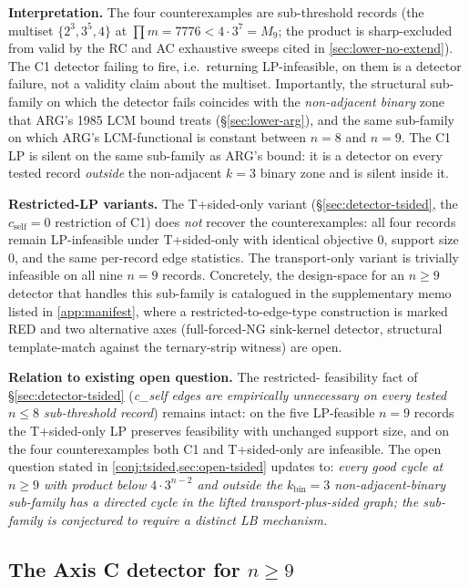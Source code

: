 \documentclass[11pt,a4paper]{article}
\theoremstyle{plain}
\theoremstyle{definition}
\begin{document}
\textbf{Interpretation.} The four counterexamples are sub-threshold
records (the multiset $\{2^3, 3^5, 4\}$ at $\prod m = 7776 < 4 \cdot
3^7 = M_9$; the product is sharp-excluded from valid by the RC and
AC exhaustive sweeps cited in \cref{sec:lower-no-extend}).  The
C1 detector failing to fire, i.e.\ returning LP-infeasible,
on them is a detector failure, not a validity claim about the
multiset.  Importantly, the structural sub-family on which the
detector fails coincides with the
\emph{non-adjacent binary} zone that ARG's 1985 LCM bound treats
(\S\ref{sec:lower-arg}), and the same sub-family on which ARG's
LCM-functional is constant between $n = 8$ and $n = 9$.  The C1 LP
is silent on the same sub-family as ARG's bound: it is a detector
on every tested record \emph{outside} the non-adjacent $k = 3$
binary zone and is silent inside it.

\textbf{Restricted-LP variants.} The T+sided-only variant
(\S\ref{sec:detector-tsided}, the $c_{\mathrm{self}} = 0$
restriction of C1) does \emph{not} recover the counterexamples:
all four records remain LP-infeasible under T+sided-only with
identical objective $0$, support size $0$, and the same per-record
edge statistics.  The transport-only variant is trivially infeasible
on all nine $n = 9$ records.  Concretely, the design-space for an
$n \ge 9$ detector that handles this sub-family is catalogued in
the supplementary memo listed in \cref{app:manifest}, where a
restricted-to-edge-type construction is marked RED and two
alternative axes (full-forced-NG sink-kernel detector, structural
template-match against the ternary-strip witness) are open.

\textbf{Relation to existing open question.} The restricted-
feasibility fact of \S\ref{sec:detector-tsided}
(\emph{c\_self edges are empirically unnecessary on every tested
$n \le 8$ sub-threshold record}) remains intact: on the five
LP-feasible $n = 9$ records the T+sided-only LP preserves
feasibility with unchanged support size, and on the four
counterexamples both C1 and T+sided-only are infeasible.  The
open question stated in \cref{conj:tsided,sec:open-tsided} updates
to: \emph{every good cycle at
$n \ge 9$ with product below $4 \cdot 3^{n-2}$ \emph{and} outside
the $k_{\mathrm{bin}} = 3$ non-adjacent-binary sub-family has a
directed cycle in the lifted transport-plus-sided graph; the
sub-family is conjectured to require a distinct LB mechanism.}

\subsection{The Axis C detector for $n \ge 9$}\label{sec:detector-axis-c}
\end{document}
